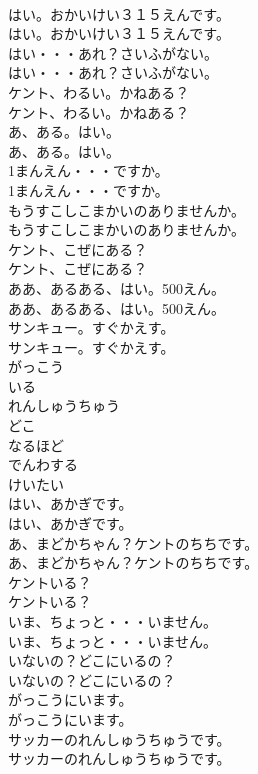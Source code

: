 \documentclass[8pt]{extreport}
\begin{document}
\begin{CJK}{UTF8}{min}
\\	はい。おかいけい３１５えんです。	
\\	はい。おかいけい３１５えんです。 
\\	はい・・・あれ？さいふがない。	
\\	はい・・・あれ？さいふがない。 
\\	ケント、わるい。かねある？	
\\	ケント、わるい。かねある？ 
\\	あ、ある。はい。	
\\	あ、ある。はい。 
\\	1まんえん・・・ですか。	
\\	1まんえん・・・ですか。 
\\	もうすこしこまかいのありませんか。	
\\	もうすこしこまかいのありませんか。 
\\	ケント、こぜにある？	
\\	ケント、こぜにある？ 
\\	ああ、あるある、はい。500えん。	
\\	ああ、あるある、はい。500えん。 
\\	サンキュー。すぐかえす。	
\\	サンキュー。すぐかえす。 
\\	がっこう
\\	いる
\\	れんしゅうちゅう
\\	どこ
\\	なるほど
\\	でんわする
\\	けいたい
\\	はい、あかぎです。	
\\	はい、あかぎです。 
\\	あ、まどかちゃん？ケントのちちです。	
\\	あ、まどかちゃん？ケントのちちです。 
\\	ケントいる？	
\\	ケントいる？ 
\\	いま、ちょっと・・・いません。	
\\	いま、ちょっと・・・いません。 
\\	いないの？どこにいるの？	
\\	いないの？どこにいるの？ 
\\	がっこうにいます。	
\\	がっこうにいます。 
\\	サッカーのれんしゅうちゅうです。	
\\	サッカーのれんしゅうちゅうです。 

\end{CJK}
\end{document}
